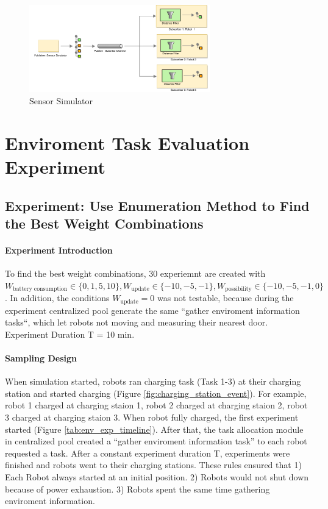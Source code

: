 \begin{figure}
\centering
\includegraphics[width = 0.7\textwidth]{content/images/ch4/sensor_simulator.drawio.png}
\caption{Sensor Simulator}
\label{fig:sensor_simulator}
\end{figure}

\section{Enviroment Task Evaluation Experiment}


\subsection{Experiment: Use Enumeration Method to Find the Best Weight Combinations}
\label{sec:enviroment_experiment_enumerate}
\paragraph{Experiment Introduction} To find the best weight combinations, 30 experiemnt are created with $W_{\mbox{battery consumption}} \in \{ 0,1,5,10 \},  W_{\mbox{update}} \in \{-10,-5,-1\}, W_{\mbox{possibility}} \in \{-10,-5,-1,0\}$. In addition, the conditions $W_{\mbox{update}}=0$ was not testable, because during the experiment centralized pool generate the same ``gather enviroment information tasks``, which let robots not moving and measuring their nearest door. Experiment Duration T = 10 min.

\paragraph{Sampling Design} When simulation started, robots ran charging task (Task 1-3) at their charging station and started charging (Figure \ref{fig:charging_station_event}). For example, robot 1 charged at charging staion 1, robot 2 charged at charging staion 2, robot 3 charged at charging staion 3. When robot fully charged, the first experiment started (Figure \ref{tab:env_exp_timeline}). After that, the task allocation module in centralized pool created a ``gather enviroment information task'' to each robot requested a task. After a constant experiment duration T, experiments were finished and robots went to their charging stations. These rules ensured that 1) Each Robot always started at an initial position. 2) Robots would not shut down because of power exhaustion. 3) Robots spent the same time gathering enviroment information.


